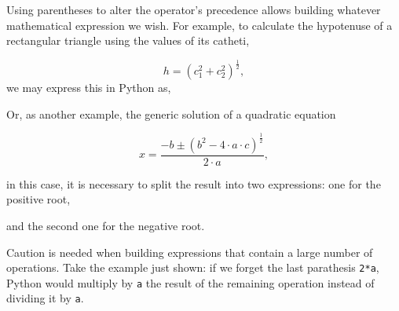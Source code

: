 \begin{paracol}{2}
Using parentheses to alter the operator's precedence allows building whatever mathematical expression we wish. For example, to calculate the hypotenuse of a rectangular triangle using the values of its catheti, 

\begin{equation*}
h=(c_1^2+c_2^2)^{\frac{1}{2}},
\end{equation*}
we may express this in Python as,

Or, as another example, the generic solution of a quadratic equation

\begin{equation*}
x= \frac{-b\pm(b^2-4\cdot a \cdot c)^{\frac{1}{2}}}{2\cdot a},
\end{equation*}

in this case, it is necessary to split the result into two expressions: one for the positive root,

and the second one for the negative root.


Caution is needed when building expressions that contain a large number of operations. Take the example just shown: if we forget the last parathesis \texttt{2*a}, Python would multiply by \texttt{a} the result of the remaining operation instead of dividing it by \texttt{a}.   
\end{paracol}
